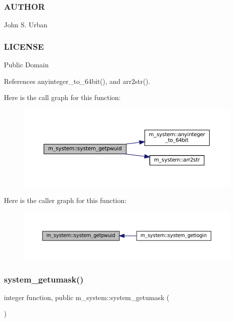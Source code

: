 \subsubsection*{A\+U\+T\+H\+OR}

John S. Urban \subsubsection*{L\+I\+C\+E\+N\+SE}

Public Domain 

References anyinteger\+\_\+to\+\_\+64bit(), and arr2str().

Here is the call graph for this function\+:
\nopagebreak
\begin{figure}[H]
\begin{center}
\leavevmode
\includegraphics[width=350pt]{namespacem__system_a59cd13de95dc9a65b444f02614ea39ce_cgraph}
\end{center}
\end{figure}
Here is the caller graph for this function\+:
\nopagebreak
\begin{figure}[H]
\begin{center}
\leavevmode
\includegraphics[width=350pt]{namespacem__system_a59cd13de95dc9a65b444f02614ea39ce_icgraph}
\end{center}
\end{figure}
\mbox{\label{namespacem__system_aa9ca951be39d2ea738d627cf42c00ddd}} 
\subsubsection{\texorpdfstring{system\+\_\+getumask()}{system\_getumask()}}
{\footnotesize\ttfamily integer function, public m\+\_\+system\+::system\+\_\+getumask (\begin{DoxyParamCaption}{ }\end{DoxyParamCaption})}



